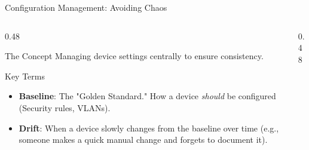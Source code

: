 \documentclass[aspectratio=169]{beamer}  %
\begin{document}
\begin{frame}{Configuration Management: Avoiding Chaos}
    \begin{columns}[T]
        \begin{column}{0.48\textwidth}
            \begin{block}{The Concept}
                \footnotesize
                Managing device settings centrally to ensure consistency.
            \end{block}
            \begin{alertblock}{Key Terms}
                \footnotesize
                \begin{itemize}
                    \item \textbf{Baseline}: The "Golden Standard." How a device \textit{should} be configured (Security rules, VLANs).
                    \item \textbf{Drift}: When a device slowly changes from the baseline over time (e.g., someone makes a quick manual change and forgets to document it).
                \end{itemize}
            \end{alertblock}
        \end{column}
        \begin{column}{0.48\textwidth}
            \begin{center}
            \end{center}
            

\end{column}
\end{columns}
\end{frame}
\end{document}
